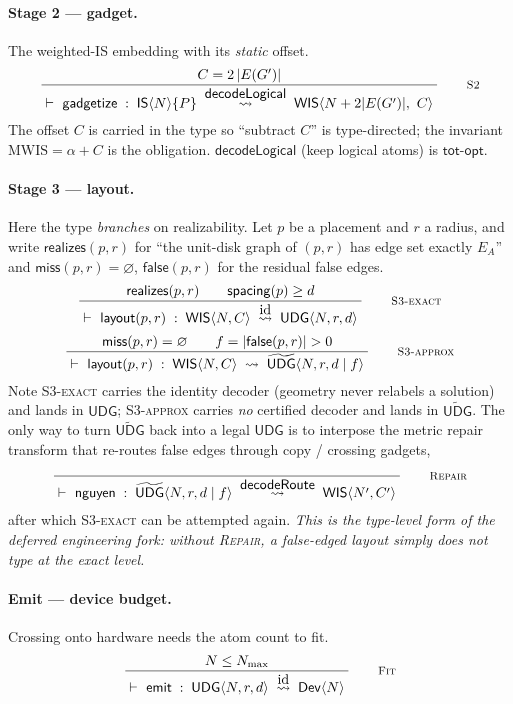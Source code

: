 \documentclass[11pt]{article}
\theoremstyle{definition}
\newcommand{\rn}[1]{\textsc{\footnotesize #1}}
\newcommand{\irule}[2]{\ensuremath{\dfrac{\;#1\;}{\;#2\;}}}
\newcommand{\redto}[1]{\mathrel{\overset{\textstyle #1}{\rightsquigarrow}}}
\newcommand{\IS}{\mathsf{IS}}
\newcommand{\WIS}{\mathsf{WIS}}
\newcommand{\UDG}{\mathsf{UDG}}
\newcommand{\UDGa}{\widetilde{\mathsf{UDG}}}
\newcommand{\Dev}{\mathsf{Dev}}
\newcommand{\alphacol}{\alpha}
\newcommand{\Nmax}{N_{\max}}
\newcommand{\realizes}{\mathsf{realizes}}
\newcommand{\false}{\mathsf{false}}
\newcommand{\miss}{\mathsf{miss}}
\newcommand{\totopt}{\mathsf{tot\text{-}opt}}
\begin{document}
\paragraph{Stage 2 --- gadget.} The weighted-IS embedding with its \emph{static}
offset.
\[
  \irule{C = 2\,|E(G')|}
        {\vdash\ \mathsf{gadgetize} \;:\; \IS\langle N\rangle\{P\}
          \;\redto{\mathsf{decodeLogical}}\; \WIS\langle N+2|E(G')|,\ C\rangle}
  \qquad\rn{S2}
\]
The offset $C$ is carried in the type so ``subtract $C$'' is type-directed; the
invariant $\mathrm{MWIS}=\alphacol+C$ is the obligation. $\mathsf{decodeLogical}$
(keep logical atoms) is $\totopt$.

\paragraph{Stage 3 --- layout.} Here the type \emph{branches} on realizability.
Let $p$ be a placement and $r$ a radius, and write $\realizes(p,r)$ for
``the unit-disk graph of $(p,r)$ has edge set exactly $E_A$'' and
$\miss(p,r)=\varnothing$, $\false(p,r)$ for the residual false edges.
\[
  \irule{\realizes(p,r) \qquad \mathsf{spacing}(p)\ge d}
        {\vdash\ \mathsf{layout}(p,r)\;:\; \WIS\langle N,C\rangle
          \;\redto{\mathrm{id}}\; \UDG\langle N,r,d\rangle}
  \qquad\rn{S3-exact}
\]
\[
  \irule{\miss(p,r)=\varnothing \qquad f=|\false(p,r)|>0}
        {\vdash\ \mathsf{layout}(p,r)\;:\; \WIS\langle N,C\rangle
          \;\rightsquigarrow\; \UDGa\langle N,r,d \mid f\rangle}
  \qquad\rn{S3-approx}
\]
Note \rn{S3-exact} carries the identity decoder (geometry never relabels a
solution) and lands in $\UDG$; \rn{S3-approx} carries \emph{no} certified decoder
and lands in $\UDGa$. The only way to turn $\UDGa$ back into a legal $\UDG$ is to
interpose the metric repair transform that re-routes false edges through copy /
crossing gadgets,
\[
  \irule{\ }
        {\vdash\ \mathsf{nguyen}\;:\; \UDGa\langle N,r,d\mid f\rangle
          \;\redto{\mathsf{decodeRoute}}\; \WIS\langle N',C'\rangle}
  \qquad\rn{Repair}
\]
after which \rn{S3-exact} can be attempted again. \emph{This is the type-level form
of the deferred engineering fork: without \rn{Repair}, a false-edged layout simply
does not type at the exact level.}

\paragraph{Emit --- device budget.} Crossing onto hardware needs the atom count
to fit.
\[
  \irule{N\le \Nmax}
        {\vdash\ \mathsf{emit}\;:\; \UDG\langle N,r,d\rangle \;\redto{\mathrm{id}}\; \Dev\langle N\rangle}
  \qquad\rn{Fit}
\]
\end{document}
